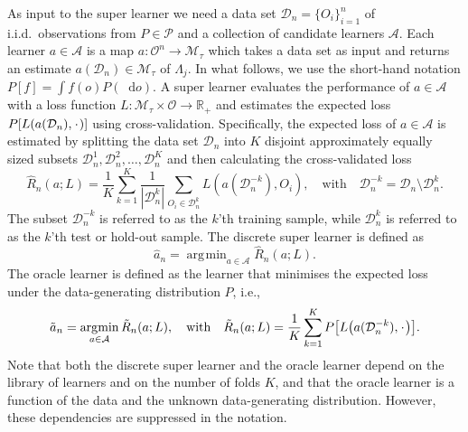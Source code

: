 \documentclass[numsec,webpdf,contemporary,medium,namedate]{oup-authoring-template}%
\theoremstyle{thmstyleone}%
\theoremstyle{thmstyletwo}%
\theoremstyle{thmstylethree}%
\newcommand{\R}{\mathbb{R}}
\newcommand{\blank}{\makebox[1ex]{\textbf{$\cdot$}}}
\newcommand*\diff{\mathop{}\!\mathrm{d}}
\newcommand{\1}{\mathds{1}}
\DeclareMathOperator*{\argmin}{\arg\!\min}
\newcommand{\empmeas}{\ensuremath{\mathbb{P}_n}} %
\newcommand{\data}{\ensuremath{\mathcal{D}}}
\begin{document}
As input to the super learner we need a data set
\( \data_n=\{O_i\}_{i=1}^n \) of i.i.d.\ observations from \( P \in \mathcal{P} \) and a collection of candidate
learners $\mathcal{A}$. Each learner \(a \in \mathcal{A}\) is a map
\( a \colon \mathcal{O}^n \rightarrow \mathcal{M}_{\tau}\) which takes a data
set as input and returns an estimate $a(\data_n) \in \mathcal{M}_{\tau}$ of
$\Lambda_{j}$.
In what follows, we use the short-hand notation
\(P[f] = \int f(o) P(\diff o) \). A super learner evaluates the
performance of \(a \in \mathcal{A}\) with a loss function
\(L\colon \mathcal{M}_{\tau} \times \mathcal{O} \rightarrow \R_+\) and
estimates the expected loss \(P[L(a(\data_n), \blank)]\) using
cross-validation. Specifically, the expected loss of $a\in\mathcal A$
is estimated by splitting the data set $\data_n$ into $K$ disjoint
approximately equally sized subsets
\(\data_n^1, \data_n^2, \dots, \data_n^K \) and then calculating the
cross-validated loss
\begin{equation*}
  \hat{R}_n(a; L) =
  \frac{1}{K}\sum_{k=1}^{K}
  \frac{1}{| \data_n^{k} |}\sum_{O_i \in \data_n^{k}}
  L
  {
    \left(
      a{ (\data_n^{-k})}
      , O_i
    \right)
  },
  \quad \text{with} \quad
  \data_n^{-k} = \data_n \setminus \data_n^{k}.
\end{equation*}
The subset \(\data_n^{-k}\) is referred to as the \(k\)'th training
sample, while \(\data_n^{k}\) is referred to as the \(k\)'th test or
hold-out sample.
The discrete super learner is defined as
\begin{equation*}
\hat{a}_n = \argmin_{a\in\mathcal A}\hat{R}_n(a; L).
\end{equation*}
The oracle learner is defined as the learner that minimises the
expected loss under the data-generating distribution \( P \),
i.e.,
\begin{equation*}
  \tilde{a}_n =
  \argmin_{a \in \mathcal{A}}
  \tilde{R}_n(a; L),
  \quad \text{with} \quad 
  \tilde{R}_n(a; L)=
  \frac{1}{K}\sum_{k=1}^{K} 
  P{
    \left[
      L
      {
        \left(
          a{ (\data_n^{-k})}
          , \blank
        \right)
      }
    \right]}
  .
\end{equation*}
Note that both the discrete super learner and the oracle learner
depend on the library of learners and on the number of folds \(K\),
and that the oracle learner is a function of the data and the unknown
data-generating distribution. However, these dependencies are
suppressed in the notation.
\end{document}
